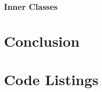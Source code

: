\documentclass[11pt, a4paper, twocolumn]{article}
\begin{document}
\subsubsection{Inner Classes}
\label{sec:inner}

\section{Conclusion}






\printbibliography[heading = bibnumbered]

\section{Code Listings}

\end{document}
